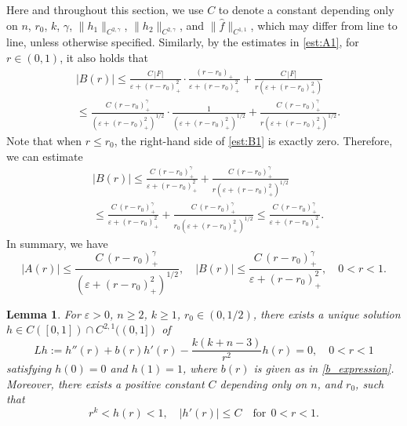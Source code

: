\documentclass[reqno, 10pt]{amsart}
\theoremstyle{plain}
\newtheorem{lemma}[theorem]{Lemma}
\theoremstyle{definition}
\theoremstyle{remark}
\numberwithin{equation}{section}
\begin{document}
Here and throughout this section, we use $C$ to denote a constant depending only on $n$, $r_0$, $k$, $\gamma$, $\|h_1\|_{C^{2,\gamma}}$, $\|h_2\|_{C^{2,\gamma}}$, and $\|\hat{f}\|_{C^{1,1}}$, which may differ from line to line, unless otherwise specified.
Similarly, by the estimates in \eqref{est:A1}, for $r\in(0,1)$, it also holds that
\begin{equation}\label{est:B1}
\begin{aligned}
   &|B(r)|\le \frac{C\,|F|}{\varepsilon + (r-r_0)_+^2}\cdot \frac{(r-r_0)_+}{\varepsilon + (r-r_0)_+^2}+\frac{C\,|F|}{r(\varepsilon + (r-r_0)_+^2)}
   \\&\le \frac{C\,(r-r_0)_+^\gamma}{(\varepsilon + (r-r_0)_+^2)^{1/2}}\cdot \frac{1}{(\varepsilon + (r-r_0)_+^2)^{1/2}}+\frac{C\,(r-r_0)_+^\gamma}{r(\varepsilon + (r-r_0)_+^2)^{1/2}}.
\end{aligned}
\end{equation}
Note that when $r\le r_0$, the right-hand side of \eqref{est:B1} is exactly zero. Therefore, we can estimate
$$
\begin{aligned}
&|B(r)|\le \frac{C\,(r-r_0)_+^\gamma}{\varepsilon + (r-r_0)_+^2}+\frac{C\,(r-r_0)_+^\gamma}{r(\varepsilon + (r-r_0)_+^2)^{1/2}}
\\&\le \frac{C\,(r-r_0)_+^\gamma}{\varepsilon + (r-r_0)_+^2}+\frac{C\,(r-r_0)_+^\gamma}{r_0(\varepsilon + (r-r_0)_+^2)^{1/2}}\le \frac{C\,(r-r_0)_+^\gamma}{\varepsilon + (r-r_0)_+^2}.
\end{aligned}
$$
In summary, we have
\begin{equation}\label{estimate_AB}
|A(r)| \le \frac{C\,(r-r_0)_+^\gamma}{(\varepsilon + (r-r_0)_+^2)^{1/2}}, \quad |B(r)| \le \frac{C\,(r-r_0)_+^\gamma}{\varepsilon + (r-r_0)_+^2} , \quad 0 < r < 1.
\end{equation}

\begin{lemma}
\label{ODE_lemma}
For $\varepsilon > 0$, $n \ge 2$, $k\ge 1$, $r_0\in(0,1/2)$, there exists a unique solution $h \in C([0,1]) \cap C^{2,1}((0,1])$ of
\begin{equation*}
Lh :=h''(r) + b(r) h'(r) - \frac{k(k+n-3)}{r^2} h(r) = 0, \quad 0 < r <1
\end{equation*}
satisfying $h(0) = 0$ and $h(1) = 1$, where $b(r)$ is given as in \eqref{b_expression}.
Moreover, there exists a positive constant $C$ depending only on $n$, and $r_0$, such that
\begin{equation}
\label{h_bounds}
r^k  < h(r) < 1, \quad |h'(r)| \le C  \quad \mbox{for}~~0 < r < 1.
\end{equation}
\end{lemma}
\end{document}
